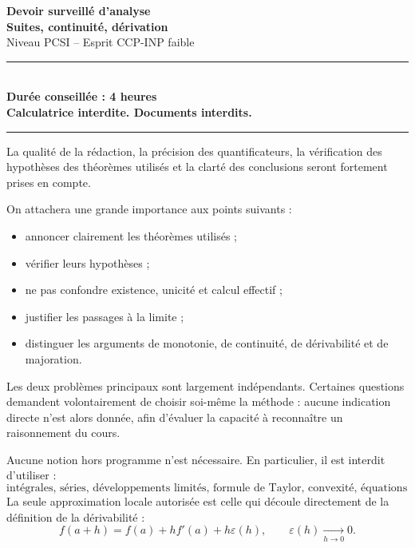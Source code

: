\documentclass[11pt,a4paper]{article}
\newcommand{\eps}{\varepsilon}
\begin{document}

\begin{center}
    {\Huge \bfseries Devoir surveillé d'analyse}\\[0.3cm]
    {\Large \bfseries Suites, continuité, dérivation}\\[0.2cm]
    {\large Niveau PCSI -- Esprit CCP-INP faible}\\[0.4cm]
    \rule{0.85\linewidth}{0.5pt}\\[0.3cm]
    \textbf{Durée conseillée : 4 heures}\\
    \textbf{Calculatrice interdite. Documents interdits.}\\[0.2cm]
    \rule{0.85\linewidth}{0.5pt}
\end{center}

\vspace{0.5cm}

\begin{consignesbox}
La qualité de la rédaction, la précision des quantificateurs, la vérification des hypothèses des théorèmes utilisés et la clarté des conclusions seront fortement prises en compte.

On attachera une grande importance aux points suivants :
\begin{itemize}
    \item annoncer clairement les théorèmes utilisés ;
    \item vérifier leurs hypothèses ;
    \item ne pas confondre existence, unicité et calcul effectif ;
    \item justifier les passages à la limite ;
    \item distinguer les arguments de monotonie, de continuité, de dérivabilité et de majoration.
\end{itemize}

Les deux problèmes principaux sont largement indépendants.  
Certaines questions demandent volontairement de choisir soi-même la méthode : aucune indication directe n'est alors donnée, afin d'évaluer la capacité à reconnaître un raisonnement du cours.
\end{consignesbox}

\vspace{0.3cm}

\begin{attentionbox}
Aucune notion hors programme n'est nécessaire.  
En particulier, il est interdit d'utiliser :
\[
\text{intégrales, séries, développements limités, formule de Taylor, convexité, équations différentielles.}
\]
La seule approximation locale autorisée est celle qui découle directement de la définition de la dérivabilité :
\[
f(a+h)=f(a)+hf'(a)+h\eps(h),
\qquad \eps(h)\xrightarrow[h\to 0]{}0.
\]
\end{attentionbox}
\end{document}
